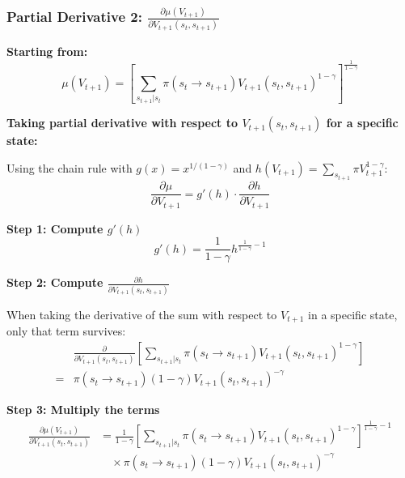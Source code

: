 \documentclass{beamer}
\begin{document}
\begin{frame}[allowframebreaks]
    \frametitle{Partial Derivative 2: $\frac{\partial \mu(V_{t+1})}{\partial V_{t+1}(s_t, s_{t+1})}$}
    
    \textbf{Starting from:}
    \begin{equation*}
        \mu(V_{t+1}) = \left[ \sum_{s_{t+1}|s_t} \pi(s_t \to s_{t+1})V_{t+1}(s_t, s_{t+1})^{1-\gamma} \right]^{\frac{1}{1-\gamma}}
    \end{equation*}
    
    \textbf{Taking partial derivative with respect to $V_{t+1}(s_t, s_{t+1})$ for a specific state:}
    
    Using the chain rule with $g(x) = x^{1/(1-\gamma)}$ and $h(V_{t+1}) = \sum_{s_{t+1}} \pi V_{t+1}^{1-\gamma}$:
    \begin{equation*}
        \frac{\partial \mu}{\partial V_{t+1}} = g'(h) \cdot \frac{\partial h}{\partial V_{t+1}}
    \end{equation*}
    
    \framebreak
    
    \textbf{Step 1: Compute $g'(h)$}
    \begin{equation*}
        g'(h) = \frac{1}{1-\gamma} h^{\frac{1}{1-\gamma}-1}
    \end{equation*}
    
    \textbf{Step 2: Compute $\frac{\partial h}{\partial V_{t+1}(s_t, s_{t+1})}$}
    
    When taking the derivative of the sum with respect to $V_{t+1}$ in a specific state, only that term survives:
    \begin{equation*}
    \begin{aligned}
       & \frac{\partial}{\partial V_{t+1}(s_t, s_{t+1})} \left[ \sum_{s_{t+1}|s_t} \pi(s_t \to s_{t+1})V_{t+1}(s_t, s_{t+1})^{1-\gamma} \right] \\
   = & \pi(s_t \to s_{t+1})(1-\gamma)V_{t+1}(s_t, s_{t+1})^{-\gamma}
    \end{aligned} 
    \end{equation*}
    
    \framebreak
    
    \textbf{Step 3: Multiply the terms}
    \begin{equation*}
        \begin{aligned}
            \frac{\partial \mu(V_{t+1})}{\partial V_{t+1}(s_t, s_{t+1})} &= \frac{1}{1-\gamma} \left[ \sum_{s_{t+1}|s_t} \pi(s_t \to s_{t+1})V_{t+1}(s_t, s_{t+1})^{1-\gamma} \right]^{\frac{1}{1-\gamma}-1} \\
            &\quad \times \pi(s_t \to s_{t+1})(1-\gamma)V_{t+1}(s_t, s_{t+1})^{-\gamma}
        \end{aligned}
    \end{equation*}
    

\end{frame}
\end{document}
